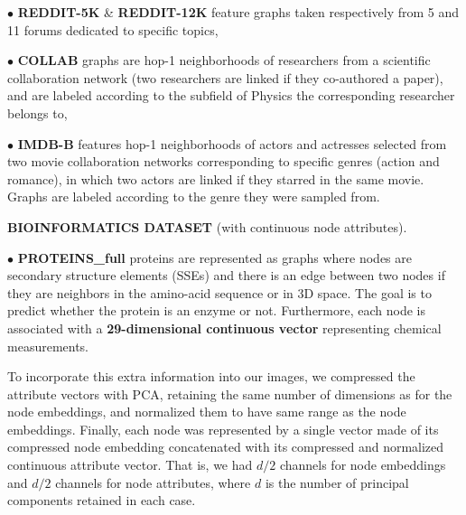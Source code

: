 \documentclass[sigconf]{acmart}
\begin{document}
\noindent$\bullet$ \textbf{REDDIT-5K} \& \textbf{REDDIT-12K} feature graphs taken respectively from 5 and 11 forums dedicated to specific topics,

\noindent$\bullet$ \textbf{COLLAB} graphs are hop-1 neighborhoods of researchers from a scientific collaboration network (two researchers are linked if they co-authored a paper), and are labeled according to the subfield of Physics the corresponding researcher belongs to,

\noindent$\bullet$ \textbf{IMDB-B} features hop-1 neighborhoods of actors and actresses selected from two movie collaboration networks corresponding to specific genres (action and romance), in which two actors are linked if they starred in the same movie. Graphs are labeled according to the genre they were sampled from.

\textbf{BIOINFORMATICS DATASET} \citep{KKMMN2016,borgwardt2005protein} (with continuous node attributes).

\noindent$\bullet$ \textbf{PROTEINS\_full} proteins are represented as graphs where nodes are secondary structure elements (SSEs) and there is
an edge between two nodes if they are neighbors in the amino-acid
sequence or in 3D space. The goal is to predict whether the protein is an enzyme or not. Furthermore, each node is associated with a \textbf{29-dimensional continuous vector} representing chemical measurements.

To incorporate this extra information into our images, we compressed the attribute vectors with PCA, retaining the same number of dimensions as for the node embeddings, and normalized them to have same range as the node embeddings. Finally, each node was represented by a single vector made of its compressed node embedding concatenated with its compressed and normalized continuous attribute vector. That is, we had $d/2$ channels for node embeddings and $d/2$ channels for node attributes, where $d$ is the number of principal components retained in each case.
\end{document}
